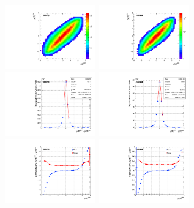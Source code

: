 \begin{figure}
  \begin{center}
    \includegraphics[width=0.35\textwidth]{fig_fullRun2UL/KinRecoResolutions/ttbar_rapidity_genreco_prompt.pdf}
    \includegraphics[width=0.35\textwidth]{fig_fullRun2UL/KinRecoResolutions/ttbar_rapidity_genreco_viatau.pdf}\\
    \includegraphics[width=0.35\textwidth]{fig_fullRun2UL/KinRecoResolutions/ttbar_rapidity_residual_prompt.pdf}
    \includegraphics[width=0.35\textwidth]{fig_fullRun2UL/KinRecoResolutions/ttbar_rapidity_residual_viatau.pdf}\\
    \includegraphics[width=0.35\textwidth]{fig_fullRun2UL/KinRecoResolutions/ttbar_rapidity_multiresidual_prompt.pdf}
    \includegraphics[width=0.35\textwidth]{fig_fullRun2UL/KinRecoResolutions/ttbar_rapidity_multiresidual_viatau.pdf}\\

\end{center}
\end{figure}

